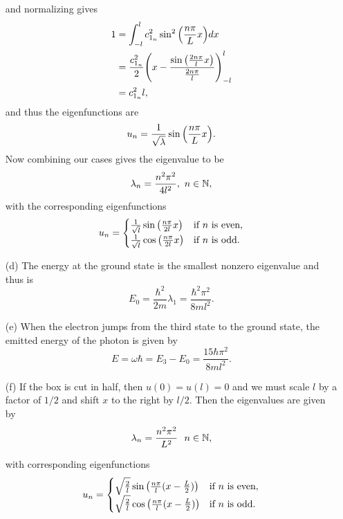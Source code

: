 \documentclass[12pt]{report}
\begin{document}
\begin{solution}
\begin{enumerate}
\[        \]
        and normalizing gives
        \begin{align*}
            1 &= \int_{-l}^{l} c_{1_n}^2\sin^2{\left(\frac{n\pi}{L}x\right)}dx\\
            &= \frac{c_{1_n}^2}{2}{\left(x - \frac{\sin{{\left(\frac{2n\pi}{l}x\right)}}}{\frac{2n\pi}{l}}\right)}_{-l}^{l}\\
            &= c_{1_n}^2l,
        \end{align*}
        and thus the eigenfunctions are
        \[ 
            u_n = \frac{1}{\sqrt{\lambda}}\sin{\left(\frac{n\pi}{L}x\right)}.
        \]
        Now combining our cases gives the eigenvalue to be
        \[ 
            \lambda_n = \frac{n^2\pi^2}{4l^2}, ~n \in {\mathbb N},
        \]
        with the corresponding eigenfunctions
        \[
            u_n = \begin{cases}
                \frac{1}{\sqrt{l}}\sin{\left(\frac{n\pi}{2l}x\right)} &\text{if $n$ is even},\\
                \frac{1}{\sqrt{l}}\cos{\left(\frac{n\pi}{2l}x\right)} &\text{if $n$ is odd.}
            \end{cases}
        \]



        \item [(d)]
        The energy at the ground state is the smallest nonzero eigenvalue and thus is
        \[ 
            E_0 = \frac{\hbar^2}{2m}\lambda_1 = \frac{\hbar^2\pi^2}{8ml^2}.
        \]
        
        \item [(e)]
        When the electron jumps from the third state to the ground state, the emitted energy of the photon is given by
        \[
            E = \omega \hbar = E_3 - E_0 = \frac{15\hbar \pi^2}{8ml^2}.
        \]
        
        \item [(f)]
        If the box is cut in half, then $u(0) = u(l) = 0$ and we must scale $l$ by a factor of $1/2$ and shift $x$ to the right by $l/2$. Then the eigenvalues are given by
        \[ 
            \lambda_n = \frac{n^2\pi^2}{L^2} ~~ n \in {\mathbb N},
        \]
            
        with corresponding eigenfunctions
        \[
            u_n = \begin{cases}
                \sqrt{\frac{2}{l}}\sin{\left(\frac{n\pi}{l}(x - \frac{L}{2})\right)} &\text{if $n$ is even},\\
                \sqrt{\frac{2}{l}}\cos{\left(\frac{n\pi}{l}(x - \frac{L}{2})\right)} &\text{if $n$ is odd.}
            \end{cases}
        \]
    \end{enumerate}


\end{solution}
\end{document}
